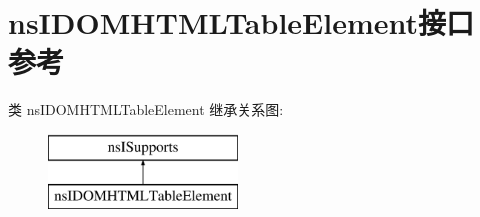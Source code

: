 \hypertarget{interfacens_i_d_o_m_h_t_m_l_table_element}{}\section{ns\+I\+D\+O\+M\+H\+T\+M\+L\+Table\+Element接口 参考}
\label{interfacens_i_d_o_m_h_t_m_l_table_element}
类 ns\+I\+D\+O\+M\+H\+T\+M\+L\+Table\+Element 继承关系图\+:\begin{figure}[H]
\begin{center}
\leavevmode
\includegraphics[height=2.000000cm]{interfacens_i_d_o_m_h_t_m_l_table_element}
\end{center}
\end{figure}
